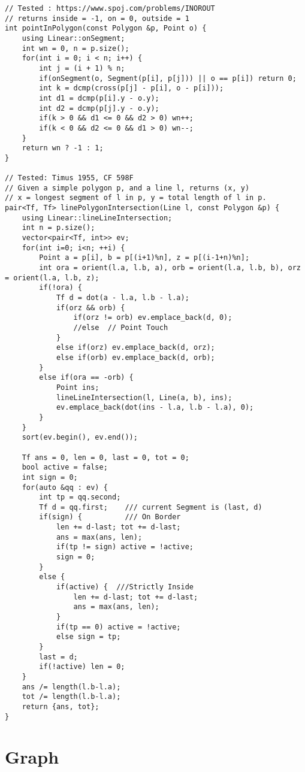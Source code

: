 \documentclass[FSZ,a4paper,onesided]{article}
\begin{document}
\begin{multicols*}{\COLS}
\begin{lstlisting}
// Tested : https://www.spoj.com/problems/INOROUT
// returns inside = -1, on = 0, outside = 1
int pointInPolygon(const Polygon &p, Point o) {
    using Linear::onSegment;
    int wn = 0, n = p.size();
    for(int i = 0; i < n; i++) {
        int j = (i + 1) % n;
        if(onSegment(o, Segment(p[i], p[j])) || o == p[i]) return 0;
        int k = dcmp(cross(p[j] - p[i], o - p[i]));
        int d1 = dcmp(p[i].y - o.y);
        int d2 = dcmp(p[j].y - o.y);
        if(k > 0 && d1 <= 0 && d2 > 0) wn++;
        if(k < 0 && d2 <= 0 && d1 > 0) wn--;
    }
    return wn ? -1 : 1;
}

// Tested: Timus 1955, CF 598F
// Given a simple polygon p, and a line l, returns (x, y)
// x = longest segment of l in p, y = total length of l in p.
pair<Tf, Tf> linePolygonIntersection(Line l, const Polygon &p) {
    using Linear::lineLineIntersection;
    int n = p.size();
    vector<pair<Tf, int>> ev;
    for(int i=0; i<n; ++i) {
        Point a = p[i], b = p[(i+1)%n], z = p[(i-1+n)%n];
        int ora = orient(l.a, l.b, a), orb = orient(l.a, l.b, b), orz = orient(l.a, l.b, z);
        if(!ora) {
            Tf d = dot(a - l.a, l.b - l.a);
            if(orz && orb) {
                if(orz != orb) ev.emplace_back(d, 0);
                //else  // Point Touch
            }
            else if(orz) ev.emplace_back(d, orz);
            else if(orb) ev.emplace_back(d, orb);
        }
        else if(ora == -orb) {
            Point ins;
            lineLineIntersection(l, Line(a, b), ins);
            ev.emplace_back(dot(ins - l.a, l.b - l.a), 0);
        }
    }
    sort(ev.begin(), ev.end());

    Tf ans = 0, len = 0, last = 0, tot = 0;
    bool active = false;
    int sign = 0;
    for(auto &qq : ev) {
        int tp = qq.second;
        Tf d = qq.first;    /// current Segment is (last, d)
        if(sign) {          /// On Border
            len += d-last; tot += d-last;
            ans = max(ans, len);
            if(tp != sign) active = !active;
            sign = 0;
        }
        else {
            if(active) {  ///Strictly Inside
                len += d-last; tot += d-last;
                ans = max(ans, len);
            }
            if(tp == 0) active = !active;
            else sign = tp;
        }
        last = d;
        if(!active) len = 0;
    }
    ans /= length(l.b-l.a);
    tot /= length(l.b-l.a);
    return {ans, tot};
}\end{lstlisting}
\section{Graph}

\end{multicols*}
\end{document}
